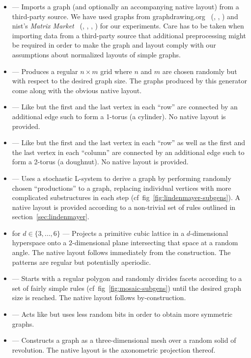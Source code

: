 \documentclass{graphstudy}
\begin{document}
\begin{itemize}
\item{} --- Imports a graph (and optionally an accompanying native layout) from a third-party source.  We
  have used graphs from \mbox{graphdrawing.org}~\cite{graphdrawing.org} (, , ) and
  \acs*{nist}'s \emph{Matrix Market}~\cite{MatrixMarket} (, , , )
  for our experiments.  Care has to be taken when importing data from a third-party source that additional preprocessing
  might be required in order to make the graph and layout comply with our assumptions about normalized layouts of simple
  graphs.
\item{} --- Produces a regular \(n\times{}m\) grid where \(n\) and \(m\) are chosen randomly but with respect
  to the desired graph size.  The graphs produced by this generator come along with the obvious native layout.
\item{} --- Like  but the first and the last vertex in each \enquote{row} are connected by an
  additional edge such to form a 1-torus (a cylinder).  No native layout is provided.
\item{} --- Like  but the first and the last vertex in each \enquote{row} as well as the first and
  the last vertex in each \enquote{column} are connected by an additional edge such to form a 2-torus (a doughnut).  No
  native layout is provided.
\item{} --- Uses a stochastic L-system to derive a graph by performing randomly chosen
  \enquote{productions} to a graph, replacing individual vertices with more complicated substructures in each step
  (\acs{cf}~\acs{fig}~\ref{fig:lindenmayer-subgens}).  A native layout is provided according to a non-trivial set of
  rules outlined in \acs{section}~\ref{sec:lindenmayer}.
\item\QuasiNd{} for \(d\in\{3,\ldots,6\}\) --- Projects a primitive cubic lattice in a \(d\)-dimensional hyperspace onto
  a \(2\)-dimensional plane intersecting that space at a random angle.  The native layout follows immediately from the
  construction.  The patterns are regular but potentially aperiodic.
\item{} --- Starts with a regular polygon and randomly divides facets according to a set of fairly simple
  rules (\acs{cf}~\acs{fig}~\ref{fig:mosaic-subgens}) until the desired graph size is reached.  The native layout
  follows by-construction.
\item{} --- Acts like  but uses less random bits in order to obtain more symmetric graphs.
\item{} --- Constructs a graph as a three-dimensional mesh over a random solid of revolution.  The native
  layout is the axonometric projection thereof.
\end{itemize}
\end{document}
